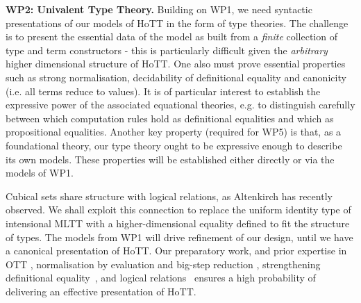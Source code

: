 \documentclass[a4paper,11pt]{article}
\begin{document}

{\bf WP2: Univalent Type Theory.} Building on WP1, we need syntactic
presentations of our models of HoTT in the form of type theories. The
challenge is to present the essential data of the model as built from
a {\em finite} collection of type and term constructors - this is
particularly difficult given the {\em arbitrary} higher dimensional
structure of HoTT. One also must prove essential properties such as strong normalisation, decidability of
definitional equality and canonicity (i.e. all terms reduce to
values). It is of particular interest to establish the expressive
power of the associated equational theories, e.g. to distinguish
carefully between which computation rules hold as definitional
equalities and which as propositional equalities. Another key property
(required for WP5) is that, as a foundational theory, our type theory
ought to be expressive enough to describe its own models. These
properties will be established either directly or via the models of
WP1.





Cubical sets share structure with logical relations, as Altenkirch has
recently observed. We shall exploit this connection to replace the
uniform identity type of intensional MLTT with a
higher-dimensional equality defined to fit the structure of types. The
models from WP1 will drive refinement of our design, until we have a
canonical presentation of HoTT. Our preparatory work, and prior
expertise in OTT \cite{alti:ott-conf}, normalisation by
evaluation and big-step reduction
\cite{alti:ctcs95,alti:lics96,alti:flops04,txa:jtait}, 
strengthening definitional
equality~\cite{Allais:2013:NEN:2502409.2502411}, and logical
relations~\cite{neil2014relParamDep} ensures a high probability of delivering
an effective presentation of HoTT. 
\end{document}
